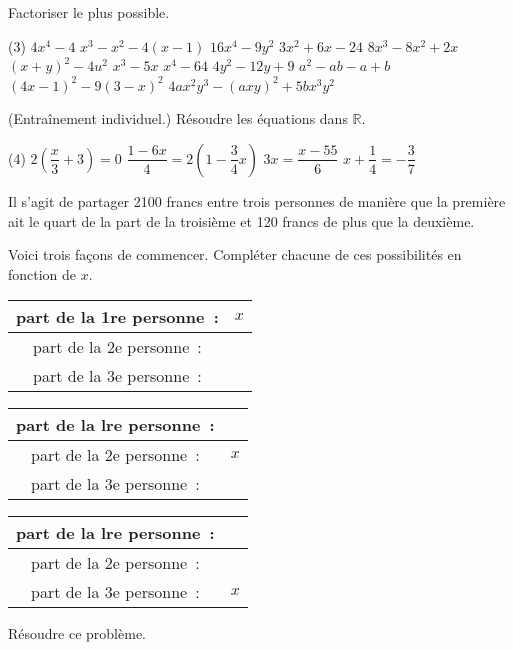 \documentclass[a4paper,12pt]{report}
\begin{document}
\vspace*{-2\baselineskip}
\begin{acti}
Factoriser le plus possible.
	\begin{tasks}(3)
\task $4 x^4-4$
\task $x^3-x^2-4(x-1)$
\task $16 x^4-9 y^2$
\task $3 x^2+6 x-24$
\task $8 x^3-8 x^2+2 x$
\task $(x+y)^2-4 u^2$
\task $x^3-5 x$
\task $x^4-64$
\task $4 y^2-12 y+9$
\task $a^2-a b-a+b$
\task $(4 x-1)^2-9(3-x)^2$
\task $4 a x^2 y^3-(a x y)^2+5 b x^3 y^2$
	\end{tasks}
\end{acti}
\begin{acti}
(Entraînement individuel.) Résoudre les équations dans $\mathbb{R}$.
	\begin{tasks}(4)
\task $2\left(\dfrac{x}{3}+3\right)=0$
\task $\dfrac{1-6 x}{4}=2\left(1-\dfrac{3}{4} x\right)$
\task $3 x=\dfrac{x-55}{6}$
\task $x+\dfrac{1}{4}=-\dfrac{3}{7}$
	\end{tasks}
\end{acti}
\begin{acti}
	Il s'agit de partager 2100 francs entre trois personnes de manière que la première ait le quart de la part de la troisième et 120 francs de plus que la deuxième.
	\begin{tasks}
		\task Voici trois façons de commencer. Compléter chacune de ces possibilités en fonction de $x$.

\begin{tabular}{|c|c|}
\hline part de la 1re personne~: & $x$ \\
\hline part de la 2e personne~: & \\ 
\hline part de la 3e personne~: &\\ 
\hline
\end{tabular}
\begin{tabular}{|c|c|}
\hline part de la lre personne~: & \\
\hline part de la 2e personne~: & $x$ \\ 
\hline part de la 3e personne~: &\\ 
\hline
\end{tabular}
\begin{tabular}{|c|c|}
\hline part de la lre personne~: &  \\
\hline part de la 2e personne~: & \\ 
\hline part de la 3e personne~: &$x$\\ 
\hline
\end{tabular}
\task Résoudre ce problème.
	\end{tasks}

\end{acti}
\end{document}
